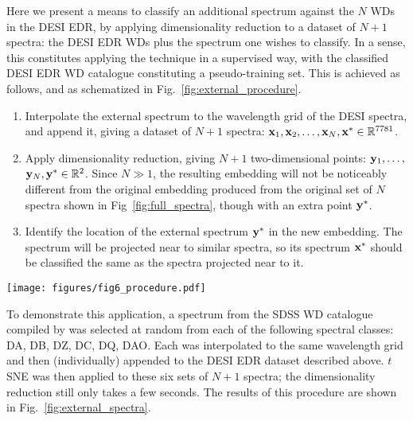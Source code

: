 \documentclass[fleqn,usenatbib]{mnras}
\def\xb{\vb{x}}
\def\yb{\vb{y}}
\begin{document}
Here we present a means to classify an additional spectrum against the $N$ WDs in the DESI EDR, by applying dimensionality reduction to a dataset of $N+1$ spectra: the DESI EDR WDs plus the spectrum one wishes to classify.
In a sense, this constitutes applying the technique in a supervised way, with the classified DESI EDR WD catalogue constituting a pseudo-training set.
This is achieved as follows, and as schematized in Fig.~\ref{fig:external_procedure}.
\begin{enumerate}
\item
Interpolate the external spectrum to the wavelength grid of the DESI spectra, and append it, giving a dataset of $N+1$ spectra: $\xb_1, \xb_2, \dots, \xb_N, \xb^* \in \mathbb{R}^{7781}$.
\item
Apply dimensionality reduction, giving $N+1$ two-dimensional points: $\yb_1, \dots,$ $\yb_N, \yb^* \in \mathbb{R}^2$.
Since $N\gg1$, the resulting embedding will not be noticeably different from the original embedding produced from the original set of $N$ spectra shown in Fig~\ref{fig:full_spectra}, though with an extra point $\yb^*$.
\item
Identify the location of the external spectrum $\yb^*$ in the new embedding.
The spectrum will be projected near to similar spectra, so its spectrum $\xb^*$ should be classified the same as the spectra projected near to it.
\end{enumerate}

\begin{figure*}
\texttt{[image: figures/fig6\_procedure.pdf]}
\caption{
    Procedure for classifying external WD spectra against DESI EDR (see text).
    One would estimate the classification of this spectrum (black) as a DA.
}
\label{fig:external_procedure}
\end{figure*}

To demonstrate this application, a spectrum from the SDSS WD catalogue compiled by \citet{gentilefusillo19} was selected at random from each of the following spectral classes: DA, DB, DZ, DC, DQ, DAO.
Each was interpolated to the same wavelength grid and then (individually) appended to the DESI EDR dataset described above.
$t$SNE was then applied to these six sets of $N+1$ spectra; the dimensionality reduction still only takes a few seconds.
The results of this procedure are shown in Fig.~\ref{fig:external_spectra}.
\end{document}
